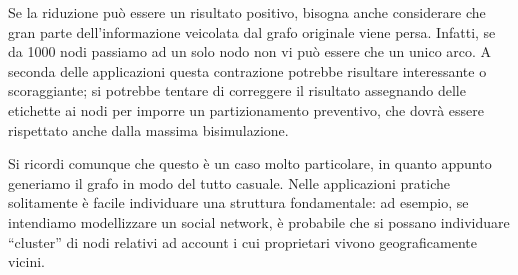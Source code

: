 Se la riduzione può essere un risultato positivo, bisogna anche considerare che gran parte dell'informazione veicolata dal grafo originale viene persa. Infatti, se da 1000 nodi passiamo ad un solo nodo non vi può essere che un unico arco. A seconda delle applicazioni questa contrazione potrebbe risultare interessante o scoraggiante; si potrebbe tentare di correggere il risultato assegnando delle etichette ai nodi per imporre un partizionamento preventivo, che dovrà essere rispettato anche dalla massima bisimulazione.

Si ricordi comunque che questo è un caso molto particolare, in quanto appunto generiamo il grafo in modo del tutto casuale. Nelle applicazioni pratiche solitamente è facile individuare una struttura fondamentale: ad esempio, se intendiamo modellizzare un social network, è probabile che si possano individuare ``cluster'' di nodi relativi ad account i cui proprietari vivono geograficamente vicini.
